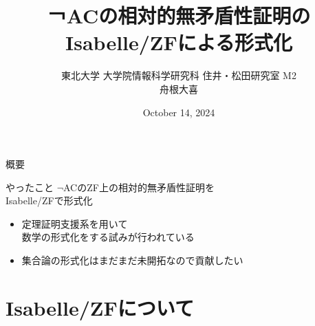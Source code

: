 \documentclass[17pt,aspectratio=169]{beamer}
\title{￢ACの相対的無矛盾性証明のIsabelle/ZFによる形式化}
\author{東北大学 大学院情報科学研究科 住井・松田研究室 M2\\ 舟根大喜}
\date{October 14, 2024}
\begin{document}
\maketitle

\begin{frame}{概要}
    \begin{itembox}[l]{やったこと}
        $\neg$ACのZF上の相対的無矛盾性証明を\\
        Isabelle/ZFで形式化
    \end{itembox}
    {\small
    \begin{itemize}
        \item 定理証明支援系を用いて\\
        数学の形式化をする試みが行われている
        \item 集合論の形式化はまだまだ未開拓なので貢献したい
    \end{itemize}}
\end{frame}

\section{Isabelle/ZFについて}
\end{document}
